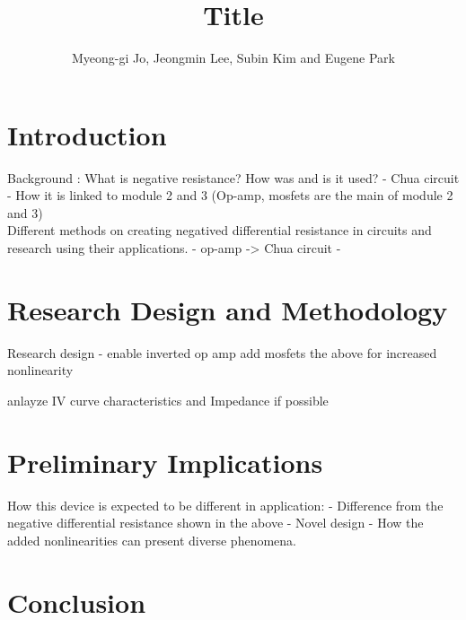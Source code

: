 \documentclass[12pt]{article}
\begin{document}
\title{Title}
\author{Myeong-gi Jo, Jeongmin Lee, Subin Kim and Eugene Park}

\maketitle

\section{Introduction}
Background : What is negative resistance?
How was and is it used?
- Chua circuit
- 
How it is linked to module 2 and 3 (Op-amp, mosfets are the main of module 2 and 3)
\\
Different methods on creating negatived differential resistance in circuits and research using their applications.
- op-amp -> Chua circuit
- 
\section{Research Design and Methodology}
Research design - enable inverted op amp
add mosfets the above for increased nonlinearity

anlayze IV curve characteristics and Impedance if possible

\section{Preliminary Implications}
How this device is expected to be different in application:
- Difference from the negative differential resistance shown in the above
- Novel design
- How the added nonlinearities can present diverse phenomena.
\section{Conclusion}
\end{document}
